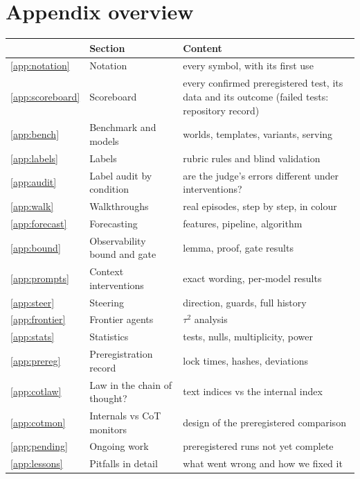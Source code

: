 \section*{Appendix overview}
\begin{center}\small
\begin{tabular}{@{}lll@{}}
\toprule
& Section & Content \\
\midrule
\ref{app:notation} & Notation & every symbol, with its first use \\
\ref{app:scoreboard} & Scoreboard & every confirmed preregistered test, its data and its outcome (failed tests: repository record) \\
\ref{app:bench} & Benchmark and models & worlds, templates, variants, serving \\
\ref{app:labels} & Labels & rubric rules and blind validation \\
\ref{app:audit} & Label audit by condition & are the judge's errors different under interventions? \\
\ref{app:walk} & Walkthroughs & real episodes, step by step, in colour \\
\ref{app:forecast} & Forecasting & features, pipeline, algorithm \\
\ref{app:bound} & Observability bound and gate & lemma, proof, gate results \\
\ref{app:prompts} & Context interventions & exact wording, per-model results \\
\ref{app:steer} & Steering & direction, guards, full history \\
\ref{app:frontier} & Frontier agents & $\tau^2$ analysis \\
\ref{app:stats} & Statistics & tests, nulls, multiplicity, power \\
\ref{app:prereg} & Preregistration record & lock times, hashes, deviations \\
\ref{app:cotlaw} & Law in the chain of thought? & text indices vs the internal index \\
\ref{app:cotmon} & Internals vs CoT monitors & design of the preregistered comparison \\
\ref{app:pending} & Ongoing work & preregistered runs not yet complete \\
\ref{app:lessons} & Pitfalls in detail & what went wrong and how we fixed it \\
\bottomrule
\end{tabular}
\end{center}

